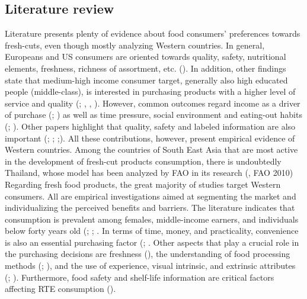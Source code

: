 \documentclass[a4,12pt]{article}
\begin{document}
\subsection{Literature review}
Literature presents plenty of evidence about food consumers' preferences towards fresh-cuts, even though mostly analyzing Western countries. In general, Europeans and US consumers are oriented towards quality, safety, nutritional elements, freshness, richness of assortment, etc. (\cite{Santeramo18}). In addition, other findings state that medium-high income consumer target, generally also high educated people (middle-class), is interested in purchasing products with a higher level of service and quality (\cite{Artes}; \cite{Watada19}, \cite{Soliva02}, \cite{Rico07}). However, common outcomes regard income as a driver of purchase (\cite{Marshall94}; \cite{Cassady07}) as well as time pressure, social environment and eating-out habits (\cite{Frewer13}; \cite{Buckley07}). Other papers highlight that quality, safety and labeled information are also important (\cite{Pilone17}; \cite{Santeramo18}; \cite{Pollard02};\cite{Baselice17}). All these contributions, however, present empirical evidence of Western countries. Among the countries of South East Asia that are most active in the development of fresh-cut products consumption, there is undoubtedly Thailand, whose model has been analyzed by FAO in its research (\cite{James10}, FAO 2010) 
Regarding fresh food products, the great majority of studies target Western consumers. All are empirical investigations aimed at segmenting the market and individualizing the perceived benefits and barriers. The literature indicates that consumption is prevalent among females, middle-income earners, and individuals below forty years old (\cite{Massaglia19}; \cite{Sgroi18}; \cite{VanLoo10}. In terms of time, money, and practicality, convenience is also an essential purchasing factor (\cite{Stiletto20}; \cite{Vidal13}. Other aspects that play a crucial role in the purchasing decisions are freshness (\cite{Dinnella14}), the understanding of food processing methods (\cite{Hicks09}; \cite{Liem16}), and the use of experience, visual intrinsic, and extrinsic attributes (\cite{Chonpracha20}; \cite{Pilone17}). Furthermore, food safety and shelf-life information are critical factors affecting RTE consumption (\cite{Baselice17}). 
\end{document}
